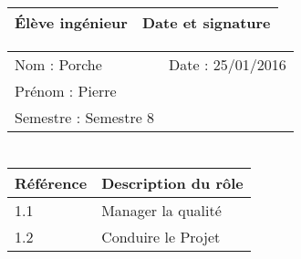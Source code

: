\documentclass[11pt]{article}
\begin{document}

\begin{center}
\begin{table}[!hp]

	\begin{tabularx}{\linewidth}{|X|X|}
	\hline
	\rowcolor{gray!40} Élève ingénieur & Date et signature \\
	\hline
	\end{tabularx}
	\begin{tabularx}{\linewidth}{|X|X|}
	Nom : Porche & Date : 25/01/2016 \\ 
	Prénom : Pierre & \\
	Semestre : Semestre 8 & \\
	\hline
	\end{tabularx}
\end{table}
\end{center}

\section*{\large\FR}

\centering
	\begin{longtable}{|p{4cm}|p{4cm}|}
	\hline
	\rowcolor{gray!40} Référence \WBSCourt & Description du rôle \\
	\hline
	 1.1 & Manager la qualité \\
	 \hline
	 1.2 & Conduire le Projet \\
	 \hline
	\end{longtable}


\section*{\large\FC}
\end{document}
